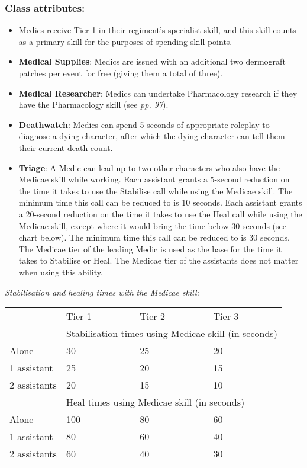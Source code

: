 \subsubsection{Class attributes:}

\begin{itemize}
\item Medics receive Tier 1 in their regiment's specialist skill, and this skill counts as a primary skill for the purposes of spending skill points.

\item \textbf{Medical Supplies}: Medics are issued with an additional two dermograft patches per event for free (giving them a total of three).

\item \textbf{Medical Researcher}: Medics can undertake Pharmacology research if they have the Pharmacology skill (see \textit{pp. 97}).

\item \textbf{Deathwatch}: Medics can spend 5 seconds of appropriate roleplay to diagnose a dying character, after which the dying character can tell them their current death count.

\item \textbf{Triage}: A Medic can lead up to two other characters who also have the Medicae skill while working. Each assistant grants a 5-second reduction on the time it takes to use the Stabilise call while using the Medicae skill. The minimum time this call can be reduced to is 10 seconds. Each assistant grants a 20-second reduction on the time it takes to use the Heal call while using the Medicae skill, except where it would bring the time below 30 seconds (see chart below). The minimum time this call can be reduced to is 30 seconds. The Medicae tier of the leading Medic is used as the base for the time it takes to Stabilise or Heal. The Medicae tier of the assistants does not matter when using this ability.

\end{itemize}
\textit{Stabilisation and healing times with the Medicae skill:}

\begin{table}[H]
\begin{tabular}{|l|l|l|l|} \hline 
\multirow{1}{*}{}& Tier 1 & Tier 2 & Tier 3 \\
\cline{2-2}\cline{3-3}\cline{4-4} & \multicolumn{3}{|l|}{Stabilisation times using Medicae skill (in seconds)} \\
 \hline Alone & 30 & 25 & 20 \\
 \hline 1 assistant & 25 & 20 & 15 \\
 \hline 2 assistants & 20 & 15 & 10 \\
 \hline  & \multicolumn{3}{|l|}{Heal times using Medicae skill (in seconds)} \\
 \hline Alone & 100 & 80 & 60 \\
 \hline 1 assistant & 80 & 60 & 40 \\
 \hline 2 assistants & 60 & 40 & 30 \\
 \hline \end{tabular}

\end{table}


